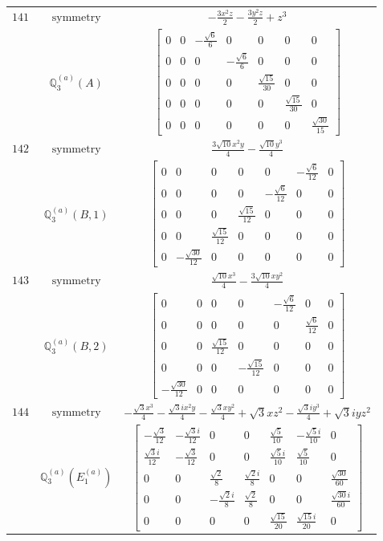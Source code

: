 \documentclass[fleqn,8pt,landscape]{jsarticle}
\begin{document}
\begin{longtable}{ccc}
$ 141 $ & $ \text{symmetry} $ & $ - \frac{3 x^{2} z}{2} - \frac{3 y^{2} z}{2} + z^{3} $ \\
$  $ & $ \mathbb{Q}_{3}^{(a)}(A) $ & $ \begin{bmatrix} 0 & 0 & - \frac{\sqrt{6}}{6} & 0 & 0 & 0 & 0 \\ 0 & 0 & 0 & - \frac{\sqrt{6}}{6} & 0 & 0 & 0 \\ 0 & 0 & 0 & 0 & \frac{\sqrt{15}}{30} & 0 & 0 \\ 0 & 0 & 0 & 0 & 0 & \frac{\sqrt{15}}{30} & 0 \\ 0 & 0 & 0 & 0 & 0 & 0 & \frac{\sqrt{30}}{15} \end{bmatrix} $ \\ \hline
$ 142 $ & $ \text{symmetry} $ & $ \frac{3 \sqrt{10} x^{2} y}{4} - \frac{\sqrt{10} y^{3}}{4} $ \\
$  $ & $ \mathbb{Q}_{3}^{(a)}(B,1) $ & $ \begin{bmatrix} 0 & 0 & 0 & 0 & 0 & - \frac{\sqrt{6}}{12} & 0 \\ 0 & 0 & 0 & 0 & - \frac{\sqrt{6}}{12} & 0 & 0 \\ 0 & 0 & 0 & \frac{\sqrt{15}}{12} & 0 & 0 & 0 \\ 0 & 0 & \frac{\sqrt{15}}{12} & 0 & 0 & 0 & 0 \\ 0 & - \frac{\sqrt{30}}{12} & 0 & 0 & 0 & 0 & 0 \end{bmatrix} $ \\ \hline
$ 143 $ & $ \text{symmetry} $ & $ \frac{\sqrt{10} x^{3}}{4} - \frac{3 \sqrt{10} x y^{2}}{4} $ \\
$  $ & $ \mathbb{Q}_{3}^{(a)}(B,2) $ & $ \begin{bmatrix} 0 & 0 & 0 & 0 & - \frac{\sqrt{6}}{12} & 0 & 0 \\ 0 & 0 & 0 & 0 & 0 & \frac{\sqrt{6}}{12} & 0 \\ 0 & 0 & \frac{\sqrt{15}}{12} & 0 & 0 & 0 & 0 \\ 0 & 0 & 0 & - \frac{\sqrt{15}}{12} & 0 & 0 & 0 \\ - \frac{\sqrt{30}}{12} & 0 & 0 & 0 & 0 & 0 & 0 \end{bmatrix} $ \\ \hline
$ 144 $ & $ \text{symmetry} $ & $ - \frac{\sqrt{3} x^{3}}{4} - \frac{\sqrt{3} i x^{2} y}{4} - \frac{\sqrt{3} x y^{2}}{4} + \sqrt{3} x z^{2} - \frac{\sqrt{3} i y^{3}}{4} + \sqrt{3} i y z^{2} $ \\
$  $ & $ \mathbb{Q}_{3}^{(a)}(E_{1}^{(a)}) $ & $ \begin{bmatrix} - \frac{\sqrt{3}}{12} & - \frac{\sqrt{3} i}{12} & 0 & 0 & \frac{\sqrt{5}}{10} & - \frac{\sqrt{5} i}{10} & 0 \\ \frac{\sqrt{3} i}{12} & - \frac{\sqrt{3}}{12} & 0 & 0 & \frac{\sqrt{5} i}{10} & \frac{\sqrt{5}}{10} & 0 \\ 0 & 0 & \frac{\sqrt{2}}{8} & \frac{\sqrt{2} i}{8} & 0 & 0 & \frac{\sqrt{30}}{60} \\ 0 & 0 & - \frac{\sqrt{2} i}{8} & \frac{\sqrt{2}}{8} & 0 & 0 & \frac{\sqrt{30} i}{60} \\ 0 & 0 & 0 & 0 & \frac{\sqrt{15}}{20} & \frac{\sqrt{15} i}{20} & 0 \end{bmatrix} $ \\ \hline

\end{longtable}
\end{document}
